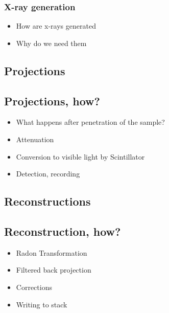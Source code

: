 \documentclass[handout,aspectratio=169,10pt]{beamer}
\begin{document}
\begin{frame}
	\frametitle{X-ray generation}
	\begin{itemize}
		\item How are x-rays generated
		\item  Why do we need them
	\end{itemize}
\end{frame}

\begin{frame}
\hypertarget{projections}{\subsection{Projections}\label{projections}}
\end{frame}

\begin{frame}
\hypertarget{projections-how}{\subsection{Projections, how?}\label{projections-how}}

\begin{itemize}
	\item What happens after penetration of the sample?
	\item Attenuation
	\item Conversion to visible light by Scintillator
	\item Detection, recording
\end{itemize}

\end{frame}

\begin{frame}
\hypertarget{reconstructions}{\subsection{Reconstructions}\label{reconstructions}}
\end{frame}

\begin{frame}
\hypertarget{reconstruction-how}{\subsection{Reconstruction, how?}\label{reconstruction-how}}

\begin{itemize}
	\item Radon Transformation
	\item Filtered back projection
	\item Corrections
	\item Writing to stack
\end{itemize}
\end{frame}
\end{document}
